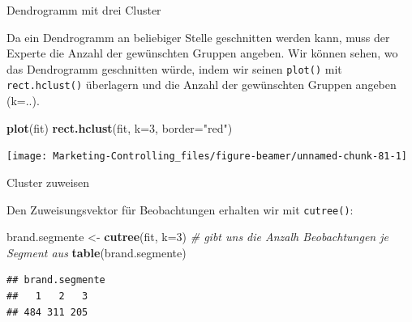 \documentclass[12pt,ngerman,a4paper,ignorenonframetext,]{beamer}
\newenvironment{Shaded}{\begin{snugshade}}{\end{snugshade}}
\newcommand{\CommentTok}[1]{\textcolor[rgb]{0.56,0.35,0.01}{\textit{#1}}}
\newcommand{\DataTypeTok}[1]{\textcolor[rgb]{0.13,0.29,0.53}{#1}}
\newcommand{\DecValTok}[1]{\textcolor[rgb]{0.00,0.00,0.81}{#1}}
\newcommand{\KeywordTok}[1]{\textcolor[rgb]{0.13,0.29,0.53}{\textbf{#1}}}
\newcommand{\NormalTok}[1]{#1}
\newcommand{\StringTok}[1]{\textcolor[rgb]{0.31,0.60,0.02}{#1}}
\begin{document}
\begin{frame}{Dendrogramm mit drei Cluster}
\protect\hypertarget{dendrogramm-mit-drei-cluster}{}

Da ein Dendrogramm an beliebiger Stelle geschnitten werden kann, muss
der Experte die Anzahl der gewünschten Gruppen angeben. Wir können
sehen, wo das Dendrogramm geschnitten würde, indem wir seinen
\texttt{plot()} mit \texttt{rect.hclust()} überlagern und die Anzahl der
gewünschten Gruppen angeben (k=..).

\begin{Shaded}
\begin{Highlighting}[]
\KeywordTok{plot}\NormalTok{(fit)}
\KeywordTok{rect.hclust}\NormalTok{(fit, }\DataTypeTok{k=}\DecValTok{3}\NormalTok{, }\DataTypeTok{border=}\StringTok{"red"}\NormalTok{)}
\end{Highlighting}
\end{Shaded}

\begin{center}\texttt{[image: Marketing-Controlling\_files/figure-beamer/unnamed-chunk-81-1]} \end{center}

\end{frame}

\begin{frame}[fragile]{Cluster zuweisen}
\protect\hypertarget{cluster-zuweisen}{}

Den Zuweisungsvektor für Beobachtungen erhalten wir mit
\texttt{cutree()}:

\begin{Shaded}
\begin{Highlighting}[]
\NormalTok{brand.segmente <-}\StringTok{ }\KeywordTok{cutree}\NormalTok{(fit, }\DataTypeTok{k=}\DecValTok{3}\NormalTok{)}
\CommentTok{# gibt uns die Anzalh Beobachtungen je Segment aus}
\KeywordTok{table}\NormalTok{(brand.segmente) }
\end{Highlighting}
\end{Shaded}

\begin{verbatim}
## brand.segmente
##   1   2   3 
## 484 311 205
\end{verbatim}

\end{frame}
\end{document}
